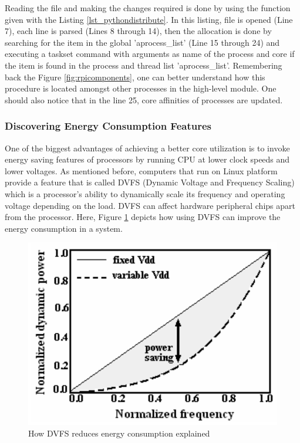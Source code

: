 Reading the file and making the changes required is done by using the function given with the Listing \ref{lst_pythondistribute}. In this listing, file is opened (Line 7), each line is parsed (Lines 8 through 14), then the allocation is done by searching for the item in the global 'aprocess{\_}list' (Line 15 through 24) and executing a taskset command with arguments as name of the process and core if the item is found in the process and thread list 'aprocess{\_}list'. Remembering back the Figure \ref{fig:rpicomponents}, one can better understand how this procedure is located amongst other processes in the high-level module. One should also notice that in the line 25, core affinities of processes are updated.


\subsubsection{Discovering Energy Consumption Features}
One of the biggest advantages of achieving a better core utilization is to invoke energy saving features of processors by running CPU at lower clock speeds and lower voltages. As mentioned before, computers that run on Linux platform provide a feature that is called DVFS (Dynamic Voltage and Frequency Scaling) \cite{dvfsieee} which is a processor's ability to dynamically scale its frequency and operating voltage depending on the load. DVFS can affect hardware peripheral chips apart from the processor. Here, Figure \ref{fig:dvfsexplanation} \cite{dvfspaper} depicts how using DVFS can improve the energy consumption in a system.

\begin{figure}[!ht]
	\centering
	\includegraphics[scale=0.3]{content/images/dvfsexplanation.png}
	\caption{How DVFS reduces energy consumption explained \cite{dvfspaper}}
	\label{fig:dvfsexplanation}
\end{figure}

